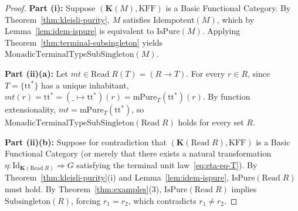 \documentclass[11pt,a4paper]{article}
\theoremstyle{definition}
\theoremstyle{remark}
\newcommand{\Id}{\mathrm{Id}}
\newcommand{\KFF}{\mathrm{KFF}}
\newcommand{\K}{\mathbf{K}}
\newcommand{\ttstar}{\mathrm{tt}^*}
\begin{document}
\begin{proof}
\textbf{Part (i):} Suppose $(\K(M), \KFF)$ is a Basic Functional Category. By
Theorem~\ref{thm:kleisli-purity}, $M$ satisfies $\mathrm{Idempotent}(M)$, which by
Lemma~\ref{lem:idem-ispure} is equivalent to $\mathrm{IsPure}(M)$. Applying
Theorem~\ref{thm:terminal-subsingleton} yields $\mathrm{MonadicTerminalTypeSubSingleton}(M)$.

\textbf{Part (ii)(a):} Let $mt \in \mathrm{Read}\;R(T) = (R \to T)$. For every $r \in R$, since
$T = \{\ttstar\}$ has a unique inhabitant, $mt(r) = \ttstar = (\_ \mapsto \ttstar)(r) =
\mathrm{mPure}_T(\ttstar)(r)$. By function extensionality, $mt = \mathrm{mPure}_T(\ttstar)$, so
$\mathrm{MonadicTerminalTypeSubSingleton}(\mathrm{Read}\;R)$ holds for every set $R$.

\textbf{Part (ii)(b):} Suppose for contradiction that $(\K(\mathrm{Read}\;R), \KFF)$ is a Basic
Functional Category (or merely that there exists a natural transformation
$\eta : \Id_{\K(\mathrm{Read}\;R)} \Rightarrow G$ satisfying the terminal unit law~\eqref{eq:eta-eq-T}).
By Theorem~\ref{thm:kleisli-purity}(i) and Lemma~\ref{lem:idem-ispure}, $\mathrm{IsPure}(\mathrm{Read}\;R)$
must hold. By Theorem~\ref{thm:examples}(3), $\mathrm{IsPure}(\mathrm{Read}\;R)$ implies
$\mathrm{Subsingleton}(R)$, forcing $r_1 = r_2$, which contradicts $r_1 \neq r_2$.


\end{proof}
\end{document}
